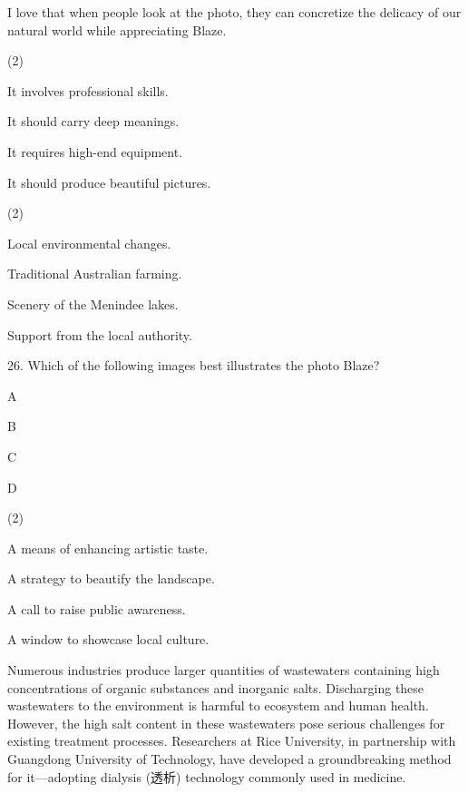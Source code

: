\documentclass{英语试卷}
\begin{document}
\par I love that when people look at the photo, they can concretize the delicacy of our natural world while appreciating Blaze.\par
{}
\begin{choices}(2)
  \item It involves professional skills.
  \item It should carry deep meanings.
  \item It requires high-end equipment.
  \item It should produce beautiful pictures.
\end{choices}
\begin{choices}(2)
  \item Local environmental changes.
  \item Traditional Australian farming.
  \item Scenery of the Menindee lakes.
  \item Support from the local authority.
\end{choices}
\par 26. Which of the following images best illustrates the photo Blaze?\par
\par [图片] A\par
\par [图片] B\par
\par [图片] C\par
\par [图片] D\par
{}
\begin{choices}(2)
  \item A means of enhancing artistic taste.
  \item A strategy to beautify the landscape.
  \item A call to raise public awareness.
  \item A window to showcase local culture.
\end{choices}
\par Numerous industries produce larger quantities of wastewaters containing high concentrations of organic substances and inorganic salts. Discharging these wastewaters to the environment is harmful to ecosystem and human health. However, the high salt content in these wastewaters pose serious challenges for existing treatment processes. Researchers at Rice University, in partnership with Guangdong University of Technology, have developed a groundbreaking method for it—adopting dialysis (透析) technology commonly used in medicine.\par
\end{document}
